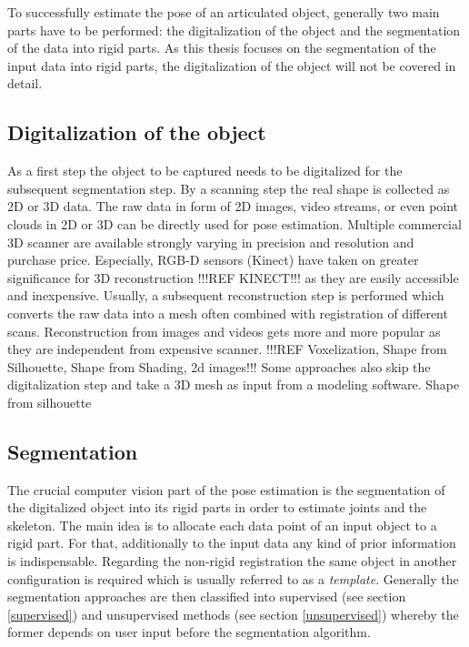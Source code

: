 To successfully estimate the pose of an articulated object, generally two main parts have to be performed: the digitalization of the object and the segmentation of the data into rigid parts. As this thesis focuses on the segmentation of the input data into rigid parts, the digitalization of the object will not be covered in detail. 

\subsection{Digitalization of the object}
\label{sec:reconstruction}
As a first step the object to be captured needs to be digitalized for the subsequent segmentation step. By a scanning step the real shape is collected as 2D or 3D data. The raw data in form of 2D images, video streams, or even point clouds in 2D or 3D can be directly used for pose estimation. Multiple commercial 3D scanner are available strongly varying in precision and resolution and purchase price. Especially, RGB-D sensors (Kinect) have taken on greater significance for 3D reconstruction !!!REF KINECT!!! as they are easily accessible and inexpensive. Usually, a subsequent reconstruction step is performed which converts the raw data into a mesh often combined with registration of different scans. Reconstruction from images and videos gets more and more popular as they are independent from expensive scanner. !!!REF
Voxelization, Shape from Silhouette, Shape from Shading, 2d images!!! Some approaches also skip the digitalization step and take a 3D mesh as input from a modeling software. Shape from silhouette \cite{mocap}
%
%
\subsection{Segmentation}
\label{sec:segmentation}

The crucial computer vision part of the pose estimation is the segmentation of the digitalized object into its rigid parts in order to estimate joints and the skeleton. The main idea is to allocate each data point of an input object to a rigid part. For that, additionally to the input data any kind of prior information is indispensable. Regarding the non-rigid registration the same object in another configuration is required which is usually referred to as a \textit{template}. Generally the segmentation approaches are then classified into supervised (see section \ref{supervised}) and unsupervised methods (see section \ref{unsupervised}) whereby the former depends on user input before the segmentation algorithm. 

